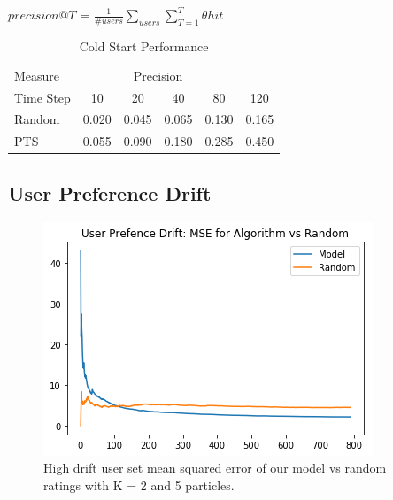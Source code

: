 \documentclass{article}
\begin{document}
\begin{center}
$precision@T$ = $\frac{1}{\#users}\sum\limits_{users}\sum\limits_{T=1}^{T}\theta hit$
\end{center}

\begin{table}[ht]
\caption{Cold Start Performance}
\label{sample-table}
\vskip 0.15in
\begin{center}
\begin{small}
\begin{sc}
\begin{tabular}{lccccc}
\toprule
Measure & \multicolumn{4}{c}{Precision}\\
Time Step  & 10     & 20     & 40   & 80    & 120 \\
\midrule
Random  &  0.020 & 0.045 & 0.065 & 0.130 & 0.165 \\
PTS     &  0.055 & 0.090 & 0.180 & 0.285 & 0.450 \\
\bottomrule
\end{tabular}
\end{sc}
\end{small}
\end{center}
\vskip -0.1in
\end{table}

\subsection{User Preference Drift}

\begin{figure}[ht]

\begin{center}
\centerline{\includegraphics[width=\columnwidth]{drift_MSE}}
\caption{High drift user set mean squared error of our model vs random ratings with K = 2 and 5 particles.}
\label{drift_MSE}
\end{center}

\vskip -0.2in
\end{figure}
\end{document}
